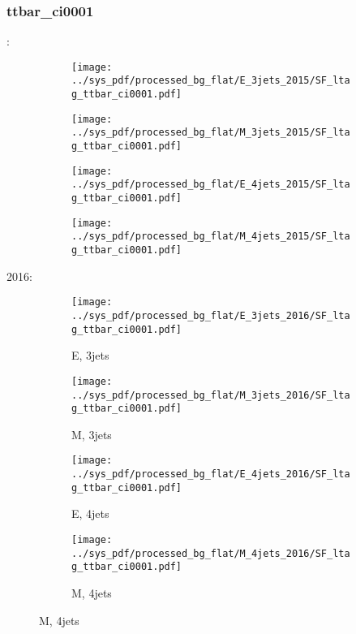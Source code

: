 \documentclass{beamer}
\begin{document}
\begin{frame}
\frametitle{ttbar_ci0001}
\fontsize{5}{1}:
\begin{figure}
\centering
\begin{subfigure}[b]{0.24\textwidth}
\texttt{[image: ../sys\_pdf/processed\_bg\_flat/E\_3jets\_2015/SF\_ltag\_ttbar\_ci0001.pdf]}
\end{subfigure}
\begin{subfigure}[b]{0.24\textwidth}
\texttt{[image: ../sys\_pdf/processed\_bg\_flat/M\_3jets\_2015/SF\_ltag\_ttbar\_ci0001.pdf]}
\end{subfigure}
\begin{subfigure}[b]{0.24\textwidth}
\texttt{[image: ../sys\_pdf/processed\_bg\_flat/E\_4jets\_2015/SF\_ltag\_ttbar\_ci0001.pdf]}
\end{subfigure}
\begin{subfigure}[b]{0.24\textwidth}
\texttt{[image: ../sys\_pdf/processed\_bg\_flat/M\_4jets\_2015/SF\_ltag\_ttbar\_ci0001.pdf]}
\end{subfigure}
\end{figure}
2016:
\begin{figure}
\centering
\begin{subfigure}[b]{0.24\textwidth}
\texttt{[image: ../sys\_pdf/processed\_bg\_flat/E\_3jets\_2016/SF\_ltag\_ttbar\_ci0001.pdf]}
\captionsetup{font=tiny}
\caption{E, 3jets}
\end{subfigure}
\begin{subfigure}[b]{0.24\textwidth}
\texttt{[image: ../sys\_pdf/processed\_bg\_flat/M\_3jets\_2016/SF\_ltag\_ttbar\_ci0001.pdf]}
\captionsetup{font=tiny}
\caption{M, 3jets}
\end{subfigure}
\begin{subfigure}[b]{0.24\textwidth}
\texttt{[image: ../sys\_pdf/processed\_bg\_flat/E\_4jets\_2016/SF\_ltag\_ttbar\_ci0001.pdf]}
\captionsetup{font=tiny}
\caption{E, 4jets}
\end{subfigure}
\begin{subfigure}[b]{0.24\textwidth}
\texttt{[image: ../sys\_pdf/processed\_bg\_flat/M\_4jets\_2016/SF\_ltag\_ttbar\_ci0001.pdf]}
\captionsetup{font=tiny}
\caption{M, 4jets}
\end{subfigure}
\end{figure}
\end{frame}
\end{document}
